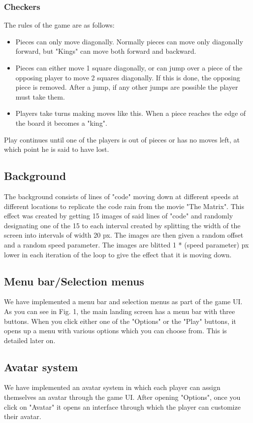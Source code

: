 \documentclass[12pt, letter]{article}
\begin{document}
\subsubsection{Checkers}
The rules of the game are as follows:
\begin{itemize}
    \item Pieces can only move diagonally. Normally pieces can move only diagonally forward, but "Kings" can move both forward and backward.
    \item Pieces can either move 1 square diagonally, or can jump over a piece of the opposing player to move 2 squares diagonally. If this is done, the opposing piece is removed. After a jump, if any other jumps are possible the player must take them.
    \item Players take turns making moves like this. When a piece reaches the edge of the board it becomes a "king".
    
\end{itemize}
Play continues until one of the players is out of pieces or has no moves left, at which point he is said to have lost.

\subsection{Background}
The background consists of lines of "code" moving down at different speeds at different locations to replicate the code rain from the movie "The Matrix". This effect was created by getting 15 images of said lines of "code" and randomly designating one of the 15 to each interval created by splitting the width of the screen into intervals of width 20 px. The images are then given a random offset and a random speed parameter. The images are blitted 1 * (speed parameter) px lower in each iteration of the loop to give the effect that it is moving down.

\subsection{Menu bar/Selection menus}
We have implemented a menu bar and selection menus as part of the game UI. As you can see in Fig. 1, the main landing screen has a menu bar with three buttons. When you click either one of the "Options" or the "Play" buttons, it opens up a menu with various options which you can choose from. This is detailed later on.

\subsection{Avatar system}
We have implemented an avatar system in which each player can assign themselves an avatar through the game UI. After opening "Options", once you click on "Avatar"  it opens an interface through which the player can customize their avatar.
\end{document}
